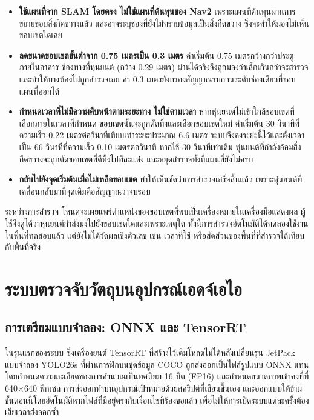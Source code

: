 \documentclass[a4paper,12pt]{report}
\begin{document}
\begin{itemize}[leftmargin=1.25cm, itemsep=6pt, topsep=6pt]
    \item \textbf{ใช้แผนที่จาก SLAM โดยตรง ไม่ใช่แผนที่ต้นทุนของ Nav2}
    เพราะแผนที่ต้นทุนผ่านการขยายขอบสิ่งกีดขวางแล้ว และอาจระบุช่องที่ยังไม่ทราบข้อมูลเป็นสิ่งกีดขวาง
    ซึ่งจะทำให้มองไม่เห็นขอบเขตใดเลย

    \item \textbf{ลดขนาดขอบเขตขั้นต่ำจาก 0.75 เมตรเป็น 0.3 เมตร}
    ค่าเริ่มต้น 0.75 เมตรกว้างกว่าประตูภายในอาคาร
    ช่องทางที่หุ่นยนต์ (กว้าง 0.29 เมตร) ผ่านได้จริงจึงถูกมองว่าเล็กเกินกว่าจะสำรวจ
    และทำให้บางห้องไม่ถูกสำรวจเลย ค่า 0.3 เมตรยังกรองสัญญาณรบกวนระดับช่องเดียวที่ขอบแผนที่ออกได้

    \item \textbf{กำหนดเวลาที่ไม่มีความคืบหน้าตามระยะทาง ไม่ใช่ตามเวลา}
    หากหุ่นยนต์ไม่เข้าใกล้ขอบเขตที่เลือกภายในเวลาที่กำหนด ขอบเขตนั้นจะถูกตัดทิ้งและเลือกขอบเขตใหม่
    ค่าเริ่มต้น 30 วินาทีที่ความเร็ว 0.22 เมตรต่อวินาทีเทียบเท่าระยะประมาณ 6.6 เมตร
    ระบบจึงคงระยะนี้ไว้และตั้งเวลาเป็น 66 วินาทีที่ความเร็ว 0.10 เมตรต่อวินาที
    หากใช้ 30 วินาทีเท่าเดิม หุ่นยนต์ที่กำลังอ้อมสิ่งกีดขวางจะถูกตัดขอบเขตที่ดีทิ้งไปทีละแห่ง
    และหยุดสำรวจทั้งที่แผนที่ยังไม่ครบ

    \item \textbf{กลับไปยังจุดเริ่มต้นเมื่อไม่เหลือขอบเขต}
    ทำให้เห็นชัดว่าการสำรวจเสร็จสิ้นแล้ว เพราะหุ่นยนต์ที่เคลื่อนกลับมาที่จุดเดิมคือสัญญาณว่าจบรอบ
\end{itemize}

ระหว่างการสำรวจ โหนดจะเผยแพร่ตำแหน่งของขอบเขตที่พบเป็นเครื่องหมายในเครื่องมือแสดงผล
ผู้ใช้จึงดูได้ว่าหุ่นยนต์กำลังมุ่งไปยังขอบเขตใดและเพราะเหตุใด
ทั้งนี้การสำรวจอัตโนมัติได้ทดลองใช้งานในพื้นที่ทดสอบแล้ว
แต่ยังไม่ได้วัดผลเชิงตัวเลข เช่น เวลาที่ใช้ หรือสัดส่วนของพื้นที่ที่สำรวจได้เทียบกับพื้นที่จริง


\section{ระบบตรวจจับวัตถุบนอุปกรณ์เอดจ์เอไอ}

\subsection{การเตรียมแบบจำลอง: ONNX และ TensorRT}
\label{sec:model-prep}

ในรุ่นแรกของระบบ ซึ่งเครื่องยนต์ TensorRT ที่สร้างไว้เดิมโหลดไม่ได้หลังเปลี่ยนรุ่น JetPack
แบบจำลอง YOLO26s ที่ผ่านการฝึกบนชุดข้อมูล COCO ถูกส่งออกเป็นไฟล์รูปแบบ ONNX แทน
โดยกำหนดความละเอียดของการคำนวณเป็นทศนิยม 16 บิต (FP16)
และกำหนดขนาดภาพเข้าคงที่ที่ 640$\times$640 พิกเซล
การส่งออกทำบนอุปกรณ์เป้าหมายด้วยสคริปต์ที่เขียนขึ้นเอง
และออกแบบให้ข้ามขั้นตอนนี้โดยอัตโนมัติหากไฟล์ที่มีอยู่ตรงกับเงื่อนไขที่ร้องขอแล้ว
เพื่อไม่ให้การเปิดระบบแต่ละครั้งต้องเสียเวลาส่งออกซ้ำ
\end{document}

